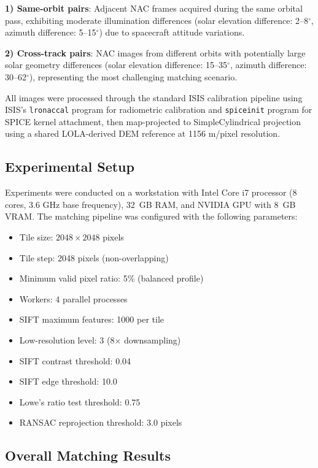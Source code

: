 \documentclass[lettersize,journal]{IEEEtran}
\begin{document}
\textbf{1) Same-orbit pairs}: Adjacent NAC frames acquired during the same orbital pass, exhibiting moderate illumination differences (solar elevation difference: 2--8$^\circ$, azimuth difference: 5--15$^\circ$) due to spacecraft attitude variations.

\textbf{2) Cross-track pairs}: NAC images from different orbits with potentially large solar geometry differences (solar elevation difference: 15--35$^\circ$, azimuth difference: 30--62$^\circ$), representing the most challenging matching scenario.

All images were processed through the standard ISIS calibration pipeline using ISIS's \texttt{lronaccal} program for radiometric calibration and \texttt{spiceinit} program for SPICE kernel attachment, then map-projected to SimpleCylindrical projection using a shared LOLA-derived DEM reference at 1156 m/pixel resolution.

\subsection{Experimental Setup}

Experiments were conducted on a workstation with Intel Core i7 processor (8 cores, 3.6 GHz base frequency), 32~GB RAM, and NVIDIA GPU with 8~GB VRAM. The matching pipeline was configured with the following parameters:

\begin{itemize}
    \item Tile size: $2048 \times 2048$ pixels
    \item Tile step: 2048 pixels (non-overlapping)
    \item Minimum valid pixel ratio: 5\% (balanced profile)
    \item Workers: 4 parallel processes
    \item SIFT maximum features: 1000 per tile
    \item Low-resolution level: 3 (8$\times$ downsampling)
    \item SIFT contrast threshold: 0.04
    \item SIFT edge threshold: 10.0
    \item Lowe's ratio test threshold: 0.75
    \item RANSAC reprojection threshold: 3.0 pixels
\end{itemize}

\subsection{Overall Matching Results}
\end{document}
